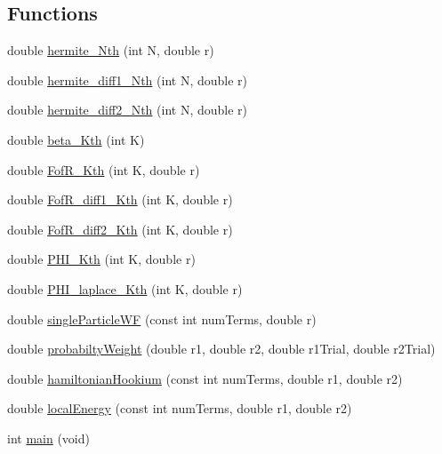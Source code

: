 \subsection*{Functions}
\begin{DoxyCompactItemize}
\item 
double \hyperlink{_hamiltonian_8_c_a99505674b3eaca3ba5e8b87d836b33d3}{hermite\-\_\-\-Nth} (int N, double r)
\item 
double \hyperlink{_hamiltonian_8_c_a7ec5cc277a531db32678aef0ece2f824}{hermite\-\_\-diff1\-\_\-\-Nth} (int N, double r)
\item 
double \hyperlink{_hamiltonian_8_c_a6793465dc0999735fe643355bad66f9c}{hermite\-\_\-diff2\-\_\-\-Nth} (int N, double r)
\item 
double \hyperlink{_hamiltonian_8_c_a55fc72b0d5d57ce3d31669436746fb4c}{beta\-\_\-\-Kth} (int K)
\item 
double \hyperlink{_hamiltonian_8_c_a3d8031037d79fc051beadafd441dcd0c}{Fof\-R\-\_\-\-Kth} (int K, double r)
\item 
double \hyperlink{_hamiltonian_8_c_a19c5936462beaa7be22d387a58f1f3c2}{Fof\-R\-\_\-diff1\-\_\-\-Kth} (int K, double r)
\item 
double \hyperlink{_hamiltonian_8_c_a2529c125e10fca386464e1bb23c81bb7}{Fof\-R\-\_\-diff2\-\_\-\-Kth} (int K, double r)
\item 
double \hyperlink{_hamiltonian_8_c_ae9b5889d7fdd0b64238fdb99de59325a}{P\-H\-I\-\_\-\-Kth} (int K, double r)
\item 
double \hyperlink{_hamiltonian_8_c_acfb28b1644fccbee065d635bd3feae69}{P\-H\-I\-\_\-laplace\-\_\-\-Kth} (int K, double r)
\item 
double \hyperlink{_hamiltonian_8_c_a0d0bbfaf224c8a9290f699eee67ff848}{single\-Particle\-W\-F} (const int num\-Terms, double r)
\item 
double \hyperlink{_hamiltonian_8_c_a4f19d549d92d976fea2e9f2a2182dd33}{probabilty\-Weight} (double r1, double r2, double r1\-Trial, double r2\-Trial)
\item 
double \hyperlink{_hamiltonian_8_c_aaca092c4d9bd831878a7794fd9c2fa22}{hamiltonian\-Hookium} (const int num\-Terms, double r1, double r2)
\item 
double \hyperlink{_hamiltonian_8_c_a883189cb4cbe7208b2c596aca18e86f0}{local\-Energy} (const int num\-Terms, double r1, double r2)
\item 
int \hyperlink{_hamiltonian_8_c_a840291bc02cba5474a4cb46a9b9566fe}{main} (void)
\end{DoxyCompactItemize}
